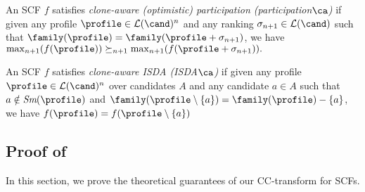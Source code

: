 \camono*

\begin{definition}\label{appdef:clone_participation}
    An SCF $f$ satisfies \emph{clone-aware (optimistic) participation (participation$\ca$)} if given any profile $\profile \in \mathcal{L}(\cand)^n$ and any ranking $\sigma_{n+1} \in\mathcal{L}(\cand) $ such that $\family(\profile)=\family(\profile+\sigma_{n+1})$, we have $\max_{n+1}(f(\profile)) \succeq_{n+1} \max_{n+1}(f(\profile+\sigma_{n+1})).$

\end{definition}

\begin{definition}\label{appdef:clone_isda}
    An SCF $f$ satisfies \emph{clone-aware ISDA (ISDA$\ca$)} if given any profile $\profile \in \mathcal{L}(\cand)^n$ over candidates $A$ and any candidate $a\in A$ such that $a \notin \textit{Sm}(\profile)$ and $\family(\profile \setminus\{a\}) = \family(\profile) - \{a\}$, we have $f(\profile)=f(\profile \setminus \{a\})$
\end{definition}






\subsection{Proof of }
In this section, we prove the theoretical guarantees of our CC-transform for SCFs.

\cctransform* 

